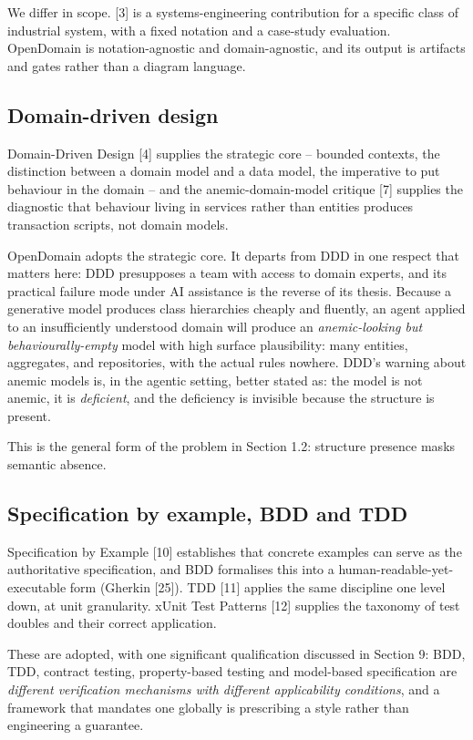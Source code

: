 \documentclass[11pt,a4paper]{article}
\begin{document}
We differ in scope. [3] is a systems-engineering contribution for a specific class of industrial system, with a fixed notation and a case-study evaluation. OpenDomain is notation-agnostic and domain-agnostic, and its output is artifacts and gates rather than a diagram language.

\subsection{Domain-driven design}

Domain-Driven Design [4] supplies the strategic core -- bounded contexts, the distinction between a domain model and a data model, the imperative to put behaviour in the domain -- and the anemic-domain-model critique [7] supplies the diagnostic that behaviour living in services rather than entities produces transaction scripts, not domain models.

OpenDomain adopts the strategic core. It departs from DDD in one respect that matters here: DDD presupposes a team with access to domain experts, and its practical failure mode under AI assistance is the reverse of its thesis. Because a generative model produces class hierarchies cheaply and fluently, an agent applied to an insufficiently understood domain will produce an \emph{anemic-looking but behaviourally-empty} model with high surface plausibility: many entities, aggregates, and repositories, with the actual rules nowhere. DDD's warning about anemic models is, in the agentic setting, better stated as: the model is not anemic, it is \emph{deficient}, and the deficiency is invisible because the structure is present.

This is the general form of the problem in Section 1.2: structure presence masks semantic absence.

\subsection{Specification by example, BDD and TDD}

Specification by Example [10] establishes that concrete examples can serve as the authoritative specification, and BDD formalises this into a human-readable-yet-executable form (Gherkin [25]). TDD [11] applies the same discipline one level down, at unit granularity. xUnit Test Patterns [12] supplies the taxonomy of test doubles and their correct application.

These are adopted, with one significant qualification discussed in Section 9: BDD, TDD, contract testing, property-based testing and model-based specification are \emph{different verification mechanisms with different applicability conditions}, and a framework that mandates one globally is prescribing a style rather than engineering a guarantee.
\end{document}
